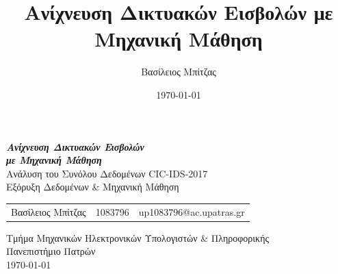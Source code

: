 \documentclass[12pt,a4paper,twoside]{book}
\makeatletter
\renewcommand{\headrulewidth}{0pt}
\renewcommand{\headrulewidth}{0pt}
\renewcommand{\sectionmark}[1]{\markboth{#1}{}}
\renewcommand{\subsectionmark}[1]{\markright{#1}}
\let\oldtableofcontents\tableofcontents
\renewcommand{\tableofcontents}{%
    \clearpage
    \thispagestyle{empty}
    \pagestyle{tocstyle}
    \oldtableofcontents
    \clearpage
    \pagestyle{fancy}
    \fancyhead[LE]{\thepage}
    \fancyhead[CE]{\leftmark}
    \fancyhead[RE]{ΚΕΦ. \thechapter}

    \fancyhead[LO]{\thesection}
    \fancyhead[CO]{\rightmark}
    \fancyhead[RO]{\thepage}

    \renewcommand{\headrulewidth}{0.4pt}

    \renewcommand{\chaptermark}[1]{\markboth{##1}{}}
    \renewcommand{\sectionmark}[1]{%
        \markright{##1}%
    }
    \renewcommand{\subsectionmark}[1]{}
}
\renewcommand\sectionmark[1]{%
  \markright{%
    \ifnum \c@secnumdepth >\z@
      \thesection\quad
    \fi
    #1}}
\makeatother
\begin{document}
\let\cleardoublepage\clearpage


\title{Ανίχνευση Δικτυακών Εισβολών με Μηχανική Μάθηση}
\author{Βασίλειος Μπίτζας}
\date{\today}

\begin{titlepage}
    \vspace*{4cm}
    \begin{center}
        {\LARGE \textbf{\textit{Ανίχνευση Δικτυακών Εισβολών}}}\\
        \vspace*{0.3cm}
        {\LARGE \textbf{\textit{με Μηχανική Μάθηση}}}\\
        \vspace*{0.5cm}
        {\large Ανάλυση του Συνόλου Δεδομένων CIC-IDS-2017}\\
        \vspace*{0.3cm}
        {\large Εξόρυξη Δεδομένων \& Μηχανική Μάθηση}
        \vspace*{5cm}
        \\
        \vspace*{1cm}
        \begin{tabular}{l l l}
            \large Βασίλειος Μπίτζας & \large 1083796 & \large up1083796@ac.upatras.gr
        \end{tabular}

        \vspace*{1cm}

        {\normalsize Τμήμα Μηχανικών Ηλεκτρονικών Υπολογιστών \& Πληροφορικής}
        \\
        {\normalsize Πανεπιστήμιο Πατρών}
        \\
        \vspace*{0.5cm}
        {\normalsize \today}
    \end{center}
    \thispagestyle{empty}
\end{titlepage}

\tableofcontents
\listoffigures
\listoftables

\end{document}
